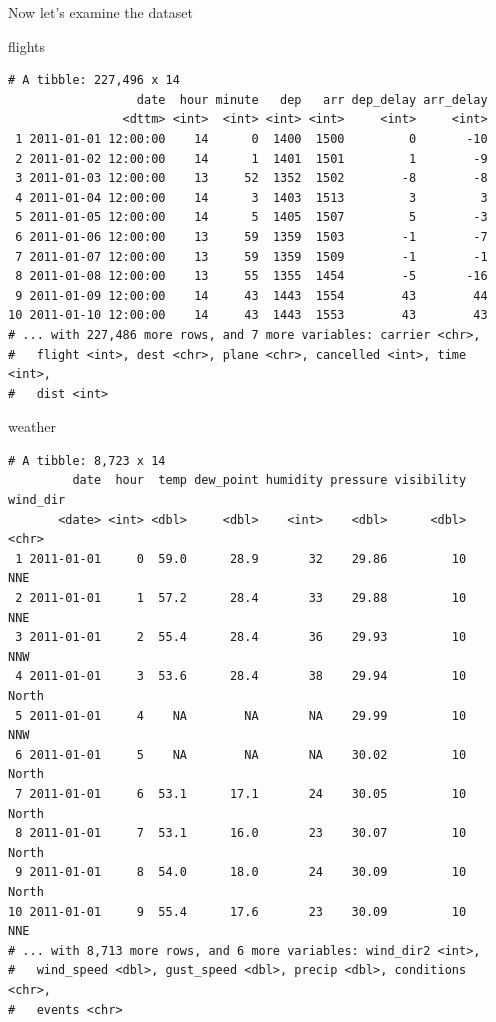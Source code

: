 \documentclass[]{article}
\newenvironment{Shaded}{\begin{snugshade}}{\end{snugshade}}
\newcommand{\NormalTok}[1]{{#1}}
\theoremstyle{definition}
\theoremstyle{definition}
\theoremstyle{definition}
\theoremstyle{remark}
\begin{document}
Now let's examine the dataset

\begin{Shaded}
\begin{Highlighting}[]
\NormalTok{flights}
\end{Highlighting}
\end{Shaded}

\begin{verbatim}
# A tibble: 227,496 x 14
                  date  hour minute   dep   arr dep_delay arr_delay
                <dttm> <int>  <int> <int> <int>     <int>     <int>
 1 2011-01-01 12:00:00    14      0  1400  1500         0       -10
 2 2011-01-02 12:00:00    14      1  1401  1501         1        -9
 3 2011-01-03 12:00:00    13     52  1352  1502        -8        -8
 4 2011-01-04 12:00:00    14      3  1403  1513         3         3
 5 2011-01-05 12:00:00    14      5  1405  1507         5        -3
 6 2011-01-06 12:00:00    13     59  1359  1503        -1        -7
 7 2011-01-07 12:00:00    13     59  1359  1509        -1        -1
 8 2011-01-08 12:00:00    13     55  1355  1454        -5       -16
 9 2011-01-09 12:00:00    14     43  1443  1554        43        44
10 2011-01-10 12:00:00    14     43  1443  1553        43        43
# ... with 227,486 more rows, and 7 more variables: carrier <chr>,
#   flight <int>, dest <chr>, plane <chr>, cancelled <int>, time <int>,
#   dist <int>
\end{verbatim}

\begin{Shaded}
\begin{Highlighting}[]
\NormalTok{weather}
\end{Highlighting}
\end{Shaded}

\begin{verbatim}
# A tibble: 8,723 x 14
         date  hour  temp dew_point humidity pressure visibility wind_dir
       <date> <int> <dbl>     <dbl>    <int>    <dbl>      <dbl>    <chr>
 1 2011-01-01     0  59.0      28.9       32    29.86         10      NNE
 2 2011-01-01     1  57.2      28.4       33    29.88         10      NNE
 3 2011-01-01     2  55.4      28.4       36    29.93         10      NNW
 4 2011-01-01     3  53.6      28.4       38    29.94         10    North
 5 2011-01-01     4    NA        NA       NA    29.99         10      NNW
 6 2011-01-01     5    NA        NA       NA    30.02         10    North
 7 2011-01-01     6  53.1      17.1       24    30.05         10    North
 8 2011-01-01     7  53.1      16.0       23    30.07         10    North
 9 2011-01-01     8  54.0      18.0       24    30.09         10    North
10 2011-01-01     9  55.4      17.6       23    30.09         10      NNE
# ... with 8,713 more rows, and 6 more variables: wind_dir2 <int>,
#   wind_speed <dbl>, gust_speed <dbl>, precip <dbl>, conditions <chr>,
#   events <chr>
\end{verbatim}
\end{document}
